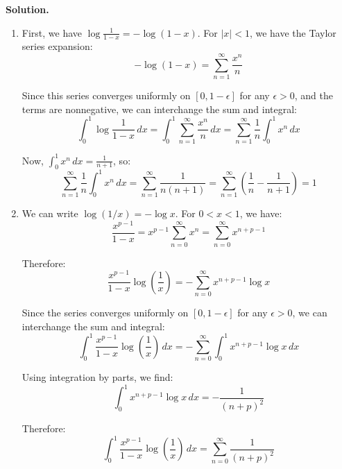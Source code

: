 \noindent\textbf{Solution.}
\begin{enumerate}[label=(\alph*)]
    \item First, we have $\log \frac{1}{1-x} = -\log(1-x)$. For $|x| < 1$, we have the Taylor series expansion:
    \[-\log(1-x) = \sum_{n=1}^{\infty} \frac{x^n}{n}\]
    
    Since this series converges uniformly on $[0, 1-\epsilon]$ for any $\epsilon > 0$, and the terms are nonnegative, we can interchange the sum and integral:
    \[\int_{0}^{1} \log \frac{1}{1-x} \, dx = \int_{0}^{1} \sum_{n=1}^{\infty} \frac{x^n}{n} \, dx = \sum_{n=1}^{\infty} \frac{1}{n} \int_{0}^{1} x^n \, dx\]
    
    Now, $\int_{0}^{1} x^n \, dx = \frac{1}{n+1}$, so:
    \[\sum_{n=1}^{\infty} \frac{1}{n} \int_{0}^{1} x^n \, dx = \sum_{n=1}^{\infty} \frac{1}{n(n+1)} = \sum_{n=1}^{\infty} \left(\frac{1}{n} - \frac{1}{n+1}\right) = 1\]
    
    \item We can write $\log(1/x) = -\log x$. For $0 < x < 1$, we have:
    \[\frac{x^{p-1}}{1-x} = x^{p-1} \sum_{n=0}^{\infty} x^n = \sum_{n=0}^{\infty} x^{n+p-1}\]
    
    Therefore:
    \[\frac{x^{p-1}}{1-x} \log \left( \frac{1}{x} \right) = -\sum_{n=0}^{\infty} x^{n+p-1} \log x\]
    
    Since the series converges uniformly on $[0, 1-\epsilon]$ for any $\epsilon > 0$, we can interchange the sum and integral:
    \[\int_{0}^{1} \frac{x^{p-1}}{1-x} \log \left( \frac{1}{x} \right) \, dx = -\sum_{n=0}^{\infty} \int_{0}^{1} x^{n+p-1} \log x \, dx\]
    
    Using integration by parts, we find:
    \[\int_{0}^{1} x^{n+p-1} \log x \, dx = -\frac{1}{(n+p)^2}\]
    
    Therefore:
    \[\int_{0}^{1} \frac{x^{p-1}}{1-x} \log \left( \frac{1}{x} \right) \, dx = \sum_{n=0}^{\infty} \frac{1}{(n+p)^2}\]
\end{enumerate}

